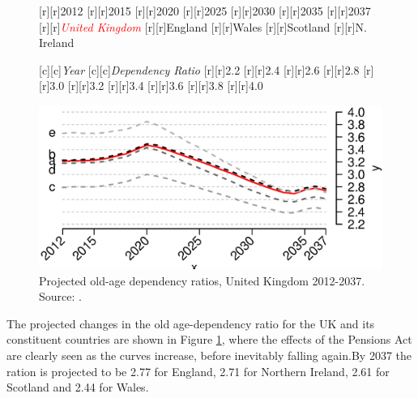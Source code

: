 \documentclass[11 pt, a4paper]{report}
\begin{document}
\begin{figure}[hbtp!]
[r][r]{\small{2012}}
[r][r]{\small{2015}}
[r][r]{\small{2020}}
[r][r]{\small{2025}}
[r][r]{\small{2030}}
[r][r]{\small{2035}}
[r][r]{\small{2037}}
[r][r]{\small{\emph{\textcolor{red}{United Kingdom}}}}
[r][r]{\small{England}}
[r][r]{\small{Wales}}
[r][r]{\small{Scotland}}
[r][r]{\small{N. Ireland}}

[c][c]{\small{\emph{Year}}}
[c][c]{\small{\emph{Dependency Ratio}}}
[r][r]{\small{2.2}}
[r][r]{\small{2.4}}
[r][r]{\small{2.6}}
[r][r]{\small{2.8}}
[r][r]{\small{3.0}}
[r][r]{\small{3.2}}
[r][r]{\small{3.4}}
[r][r]{\small{3.6}}
[r][r]{\small{3.8}}
[r][r]{\small{4.0}}

\includegraphics[width=\textwidth]{../figures/Fig4.4.eps}
\caption{Projected old-age dependency ratios, United Kingdom 2012-2037. Source: \cite{ONS2014b}.}
\label{Fig:15}
\end{figure}

The projected changes in the old age-dependency ratio for the UK and its constituent countries are shown in Figure \ref{Fig:15}, where the effects of the Pensions Act are clearly seen as the curves increase, before inevitably falling again.By 2037 the ration is projected to be 2.77 for England, 2.71 for Northern Ireland, 2.61 for Scotland and 2.44 for Wales.
\end{document}
